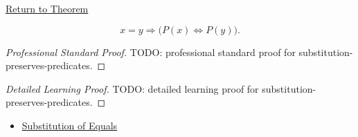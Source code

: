 \newpage
{}
\label{prf:substitution-preserves-predicates}

\begin{remark*}[Return]
\hyperref[prop:substitution-preserves-predicates]{Return to Theorem}
\end{remark*}

\begin{proposition*}
\[
x=y \Longrightarrow \bigl(P(x)\Longleftrightarrow P(y)\bigr).
\]
\end{proposition*}

\begin{proof}[Professional Standard Proof]
\LRAProofBodyStart
TODO: professional standard proof for substitution-preserves-predicates.
\end{proof}

\begin{proof}[Detailed Learning Proof]
\LRAProofBodyStart
TODO: detailed learning proof for substitution-preserves-predicates.
\end{proof}

\begin{remark*}
\end{remark*}

\begin{dependencies}
\begin{itemize}
  \item \hyperref[ax:equality-substitution]{Substitution of Equals}
\end{itemize}
\end{dependencies}

\clearpage

